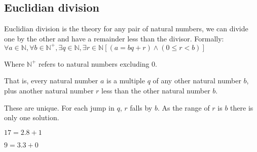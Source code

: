 
\subsection{Euclidian division}

Euclidian division is the theory for any pair of natural numbers, we can divide one by the other and have a remainder less than the divisor. Formally:
\(\forall a \in \mathbb{N} ,\forall b \in \mathbb{N}^+ ,\exists q \in \mathbb{N},\exists r\in \mathbb{N} [(a=bq+r)\land (0\le r < b)]\)

Where \(\mathbb{N}^+\) refers to natural numbers excluding \(0\).

That is, every natural number \(a\) is a multiple \(q\) of any other natural number \(b\), plus another natural number \(r\) less than the other natural number \(b\).

These are unique. For each jump in \(q\), \(r\) falls by \(b\). As the range of \(r\) is \(b\) there is only one solution.

\(17=2.8+1\)

\(9=3.3+0\)


